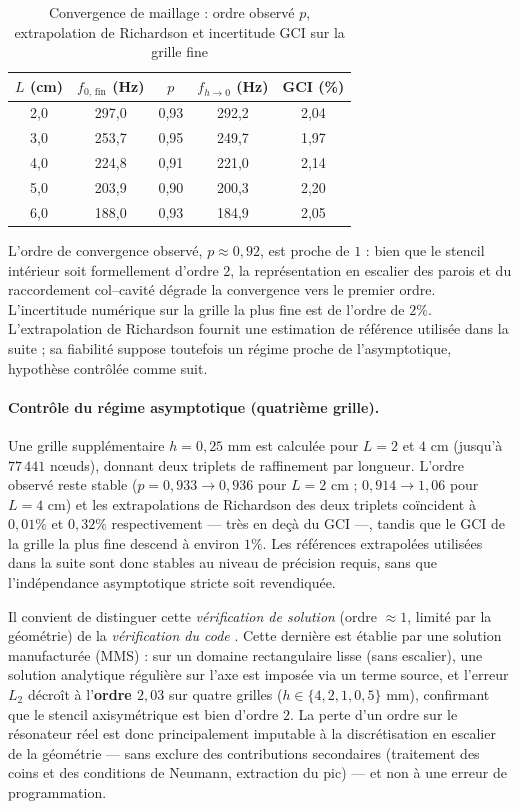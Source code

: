 \documentclass[11pt,a4paper,twocolumn]{article}
\begin{document}
\begin{table}[h]
\centering
\caption{Convergence de maillage : ordre observé $p$, extrapolation de Richardson et incertitude GCI sur la grille fine}
\label{tab:gci}
\begin{tabular}{ccccc}
\toprule
$L$ (cm) & $f_{0,\,\mathrm{fin}}$ (Hz) & $p$ & $f_{h\to0}$ (Hz) & GCI (\%) \\
\midrule
2{,}0 & 297{,}0 & 0{,}93 & 292{,}2 & 2{,}04 \\
3{,}0 & 253{,}7 & 0{,}95 & 249{,}7 & 1{,}97 \\
4{,}0 & 224{,}8 & 0{,}91 & 221{,}0 & 2{,}14 \\
5{,}0 & 203{,}9 & 0{,}90 & 200{,}3 & 2{,}20 \\
6{,}0 & 188{,}0 & 0{,}93 & 184{,}9 & 2{,}05 \\
\bottomrule
\end{tabular}
\end{table}

L'ordre de convergence observé, $p \approx 0{,}92$, est proche de $1$ : bien que le stencil intérieur soit formellement d'ordre $2$, la représentation en escalier des parois et du raccordement col–cavité dégrade la convergence vers le premier ordre. L'incertitude numérique sur la grille la plus fine est de l'ordre de $2\%$. L'extrapolation de Richardson fournit une estimation de référence utilisée dans la suite ; sa fiabilité suppose toutefois un régime proche de l'asymptotique, hypothèse contrôlée comme suit.

\paragraph{Contrôle du régime asymptotique (quatrième grille).} Une grille supplémentaire $h=0{,}25$ mm est calculée pour $L=2$ et $4$ cm (jusqu'à $77\,441$ nœuds), donnant deux triplets de raffinement par longueur. L'ordre observé reste stable ($p = 0{,}933 \to 0{,}936$ pour $L=2$ cm ; $0{,}914 \to 1{,}06$ pour $L=4$ cm) et les extrapolations de Richardson des deux triplets coïncident à $0{,}01\%$ et $0{,}32\%$ respectivement — très en deçà du GCI —, tandis que le GCI de la grille la plus fine descend à environ $1\%$. Les références extrapolées utilisées dans la suite sont donc stables au niveau de précision requis, sans que l'indépendance asymptotique stricte soit revendiquée.

Il convient de distinguer cette \emph{vérification de solution} (ordre $\approx 1$, limité par la géométrie) de la \emph{vérification du code} \cite{roache1998verification}. Cette dernière est établie par une solution manufacturée (MMS) : sur un domaine rectangulaire lisse (sans escalier), une solution analytique régulière sur l'axe est imposée via un terme source, et l'erreur $L_2$ décroît à l'\textbf{ordre $2{,}03$} sur quatre grilles ($h \in \{4, 2, 1, 0{,}5\}$ mm), confirmant que le stencil axisymétrique est bien d'ordre $2$. La perte d'un ordre sur le résonateur réel est donc principalement imputable à la discrétisation en escalier de la géométrie — sans exclure des contributions secondaires (traitement des coins et des conditions de Neumann, extraction du pic) — et non à une erreur de programmation.
\end{document}
